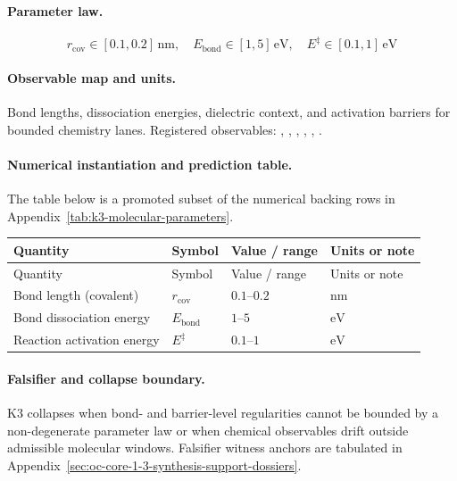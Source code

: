 \paragraph{Parameter law.}
\[
r_{\mathrm{cov}} \in [0.1, 0.2]\,\mathrm{nm},\quad E_{\mathrm{bond}} \in [1, 5]\,\mathrm{eV},\quad E^\ddagger \in [0.1, 1]\,\mathrm{eV}
\]

\paragraph{Observable map and units.}
Bond lengths, dissociation energies, dielectric context, and activation barriers for bounded chemistry lanes.
Registered observables: , \allowbreak {}, \allowbreak {}, \allowbreak {}, \allowbreak {}, \allowbreak {}.

\paragraph{Numerical instantiation and prediction table.}
The table below is a promoted subset of the numerical backing rows in Appendix~\ref{tab:k3-molecular-parameters}.
\begin{longtable}{@{}L{0.27\textwidth}L{0.15\textwidth}L{0.24\textwidth}L{0.16\textwidth}@{}}
\toprule
Quantity & Symbol & Value / range & Units or note \\
\midrule
\endfirsthead
\toprule
Quantity & Symbol & Value / range & Units or note \\
\midrule
\endhead
Bond length (covalent) & $\scriptstyle r_{\mathrm{cov}}$ & $0.1\text{--}0.2$ & $\mathrm{nm}$ \\
Bond dissociation energy & $\scriptstyle E_{\mathrm{bond}}$ & $1\text{--}5$ & $\mathrm{eV}$ \\
Reaction activation energy & $\scriptstyle E^\ddagger$ & $0.1\text{--}1$ & $\mathrm{eV}$ \\
\bottomrule
\end{longtable}

\paragraph{Falsifier and collapse boundary.}
K3 collapses when bond- and barrier-level regularities cannot be bounded by a non-degenerate parameter law or when chemical observables drift outside admissible molecular windows.
Falsifier witness anchors are tabulated in Appendix~\ref{sec:oc-core-1-3-synthesis-support-dossiers}.

